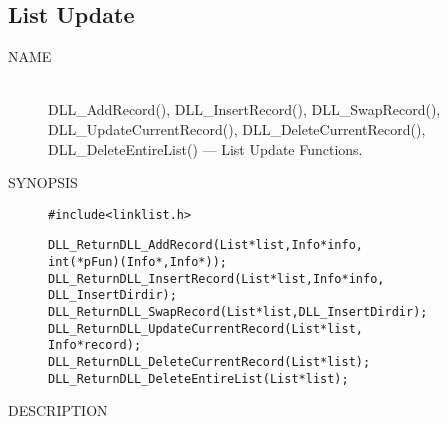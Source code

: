 \documentclass[10pt,letterpaper,titlepage]{article}
\begin{document}
\subsection{List Update}
\begin{description}
\item[NAME]\quad\\
DLL\_AddRecord(), DLL\_InsertRecord(), DLL\_SwapRecord(),\\
DLL\_UpdateCurrentRecord(), DLL\_DeleteCurrentRecord(),\\
DLL\_DeleteEntireList() --- List Update Functions.

\item[SYNOPSIS]
\begin{alltt}

#include <linklist.h>

DLL_Return DLL_AddRecord(List *list, Info *info,
   int (*pFun)(Info *, Info *));
DLL_Return DLL_InsertRecord(List *list, Info *info,
   DLL_InsertDir dir);
DLL_Return DLL_SwapRecord(List *list, DLL_InsertDir dir);
DLL_Return DLL_UpdateCurrentRecord(List *list,
   Info *record);
DLL_Return DLL_DeleteCurrentRecord(List *list);
DLL_Return DLL_DeleteEntireList(List *list);
\end{alltt}

\item[DESCRIPTION]\quad\\




\end{description}
\pagebreak
\end{document}
